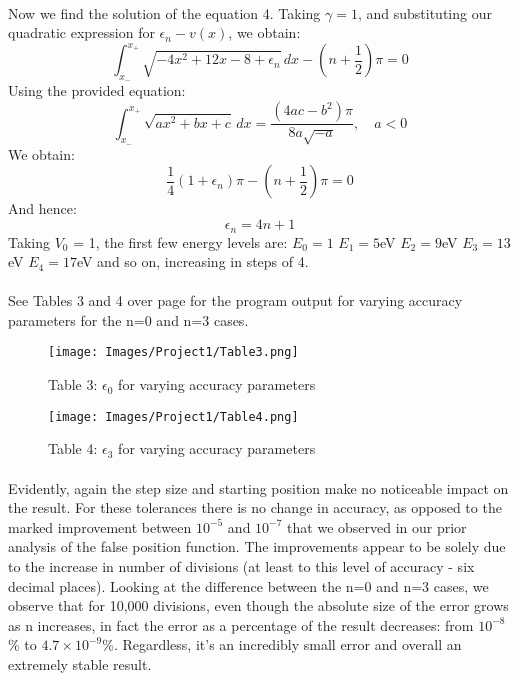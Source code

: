 \documentclass[10pt]{article}
\begin{document}
{\paragraph{}
Now we find the solution of the equation 4. Taking $\gamma = 1$, and substituting our quadratic expression for $\epsilon_n - v(x)$, we obtain:
\begin{equation} \int_{x_-}^{x_+} \sqrt{-4 x^2 + 12x - 8 + \epsilon_n} \, dx - (n + \frac{1}{2}) \pi = 0 \end{equation}
Using the provided equation:
\begin{equation} \int_{x_-}^{x_+} \sqrt{ax^2 + bx + c} \, dx = \frac{(4ac-b^2)\pi}{8a\sqrt{-a}}, \quad a < 0 \end{equation}
We obtain:
\begin{equation} \frac{1}{4}(1 + \epsilon_n)\pi - (n + \frac{1}{2})\pi = 0 \end{equation}
And hence:
\begin{equation} \epsilon_n = 4n+1 \end{equation}
Taking $V_0$ = 1, the first few energy levels are: \newline
$E_0 = 1$ \quad\quad\quad $E_1 = 5$eV \quad\quad\quad $E_2 = 9$eV \quad\quad\quad $E_3 = 13$eV \quad\quad\quad $E_4 = 17$eV \newline
and so on, increasing in steps of 4.

\paragraph{}
See Tables 3 and 4 over page for the program output for varying accuracy parameters for the n=0 and n=3 cases.

\begin{figure}[h]
\texttt{[image: Images/Project1/Table3.png]}\centering \caption*{\footnotesize Table 3: $\epsilon_0$ for varying accuracy parameters}
\end{figure}

\begin{figure}[h]
\texttt{[image: Images/Project1/Table4.png]} \centering \caption*{\footnotesize Table 4: $\epsilon_3$ for varying accuracy parameters}
\end{figure}

\paragraph{}
Evidently, again the step size and starting position make no noticeable impact on the result. For these tolerances there is no change in accuracy, as opposed to the marked improvement between $10^{-5}$ and $10^{-7}$ that we observed in our prior analysis of the false position function. The improvements appear to be solely due to the increase in number of divisions (at least to this level of accuracy - six decimal places). Looking at the difference between the n=0 and n=3 cases, we observe that for 10,000 divisions, even though the absolute size of the error grows as n increases, in fact the error as a percentage of the result decreases: from $10^{-8}$\% to $4.7 \times 10^{-9}$\%. Regardless, it's an incredibly small error and overall an extremely stable result.

}
\end{document}
